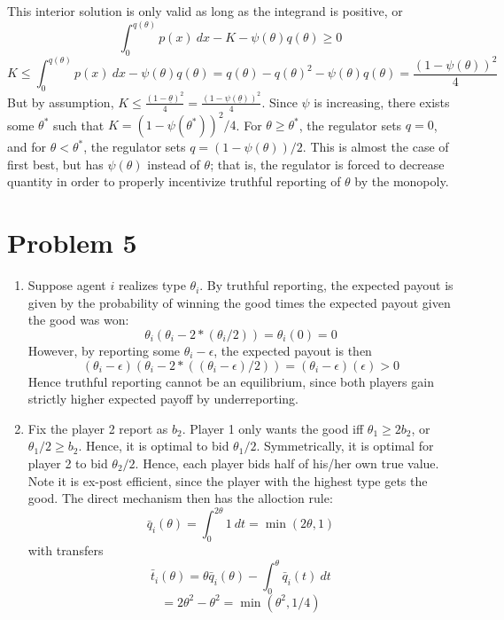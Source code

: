 \documentclass[10pt,letter]{article}
\begin{document}
\begin{enumerate}[label=(\alph*)]
This interior solution is only valid as long as the integrand is positive, or
\[ \int_0^{q(\theta)}p(x) \ dx - K - \psi(\theta) q(\theta) \ge 0 \]
\[ K \le \int_0^{q(\theta)}p(x) \ dx - \psi(\theta) q(\theta) = q(\theta) - q(\theta)^2 - \psi(\theta)q(\theta) = \frac{(1-\psi(\theta))^2}{4} \]
But by assumption, $K \le \frac{(1-\underline{\theta})^2}{4} = \frac{(1-\psi(\underline{\theta}))^2}{4}$. Since $\psi$ is increasing, there exists some $\theta^*$ such that $K = (1-\psi(\theta^*))^2/4$. For $\theta \ge \theta^*$, the regulator sets $q = 0$, and for $\theta < \theta^*$, the regulator sets $q = (1-\psi(\theta))/2$.
This is almost the case of first best, but has $\psi(\theta)$ instead of $\theta$; that is, the regulator is forced to decrease quantity in order to properly incentivize truthful reporting of $\theta$ by the monopoly.
\end{enumerate}
\section*{Problem 5}
\begin{enumerate}[label=(\alph*)]
\item Suppose agent $i$ realizes type $\theta_i$. By truthful reporting, the expected payout is given by the probability of winning the good times the expected payout given the good was won:
\[ \theta_i \left(\theta_i - 2 * (\theta_i/2)\right) = \theta_i (0) = 0 \]
However, by reporting some $\theta_i - \epsilon$, the expected payout is then
\[ (\theta_i - \epsilon) \left(\theta_i  - 2 * ((\theta_i - \epsilon)/2)\right) = (\theta_i - \epsilon) (\epsilon) > 0 \]
Hence truthful reporting cannot be an equilibrium, since both players gain strictly higher expected payoff by underreporting.
\item Fix the player 2 report as $b_2$. Player 1 only wants the good iff $\theta_1 \ge 2b_2$, or $\theta_1/2 \ge b_2$. Hence, it is optimal to bid $\theta_1/2$. Symmetrically, it is optimal for player 2 to bid $\theta_2/2$. Hence, each player bids half of his/her own true value. Note it is ex-post efficient, since the player with the highest type gets the good. The direct mechanism then has the alloction rule:
\[ \bar{q}_i(\theta) = \int_0^{2\theta} 1 \ dt = \min(2\theta,1)  \]
with transfers
\[ \bar{t}_i(\theta) = \theta \bar{q}_i(\theta) - \int_0^\theta \bar{q}_i(t) \ dt \]
\[ = 2\theta^2 - \theta^2 = \min(\theta^2,1/4) \]
\end{enumerate}
\end{document}
